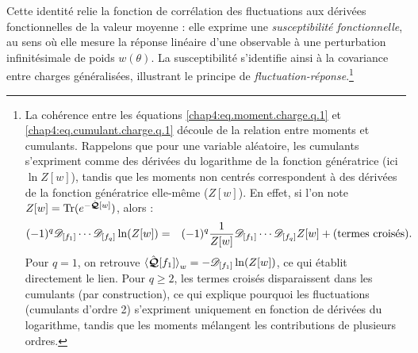 {Cette identité relie la fonction de corrélation des fluctuations aux dérivées fonctionnelles de la valeur moyenne : elle exprime une \emph{susceptibilité fonctionnelle}, au sens où elle mesure la réponse linéaire d'une observable à une perturbation infinitésimale de poids $w(\theta)$. La susceptibilité s'identifie ainsi à la covariance entre charges généralisées, illustrant le principe de \emph{fluctuation-réponse}.\footnote{
La cohérence entre les équations \eqref{chap4:eq.moment.charge.q.1} et \eqref{chap4:eq.cumulant.charge.q.1} découle de la relation entre moments et cumulants. Rappelons que pour une variable aléatoire, les cumulants s'expriment comme des dérivées du logarithme de la fonction génératrice (ici $\ln Z[w]$), tandis que les moments non centrés correspondent à des dérivées de la fonction génératrice elle-même ($Z[w]$). En effet, si l'on note $Z[w] = \mathrm{Tr}(e^{-\hat{\bm{\mathcal{Q}}}[w]})$, alors :
\begin{eqnarray*}
	(-1)^q \mathscr{D}_{[f_1]} \cdots \mathscr{D}_{[f_q]} \ln(Z[w]) &=& (-1)^q \frac{1}{Z[w]} \mathscr{D}_{[f_1]} \cdots \mathscr{D}_{[f_q]} Z[w] + \text{(termes croisés)}.
\end{eqnarray*}
Pour $q=1$, on retrouve $\braket{\hat{\bm{\mathcal{Q}}}[f_1]}_w = -\mathscr{D}_{[f_1]}\ln(Z[w])$, ce qui établit directement le lien. Pour $q \geq 2$, les termes croisés disparaissent dans les cumulants (par construction), ce qui explique pourquoi les fluctuations (cumulants d'ordre 2) s'expriment uniquement en fonction de dérivées du logarithme, tandis que les moments mélangent les contributions de plusieurs ordres.
}

\medskip
}


